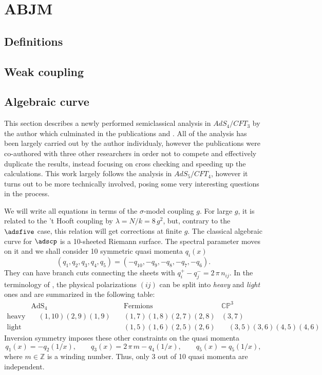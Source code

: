 
\section{ABJM}

\subsection{Definitions}

\subsection{Weak coupling}

\subsection{Algebraic curve}


This section describes a newly performed semiclassical analysis in $AdS_4/CFT_3$ by the author which culminated in the publications \cite{Beccaria:2012qd} and \cite{Beccaria:2012vb}. All of the analysis has been largely carried out by the author individualy, however the publications were co-authored with three other researchers in order not to compete and effectively duplicate the results, instead focusing on cross checking and speeding up the calculations. This work largely follows the analysis in $AdS_5/CFT_4$, however it turns out to be more technically involved, posing some very interesting questions in the process. 

We will write all equations in terms of the $\sigma$-model coupling $g$. For large $g$, it is  related to the 't Hooft coupling by $\lambda = N/k = 8\,g^{2}$, but, contrary to the $\adsfive$ case, this relation will get corrections at finite $g$.  The classical algebraic curve for $\adscp$ is a 10-sheeted Riemann surface. The spectral parameter moves on it and  we shall consider 10 symmetric quasi momenta $q_{i}(x)$ 
\begin{equation}
(q_{1}, q_{2}, q_{3}, q_{4}, q_{5}) = (-q_{10}, -q_{9}, -q_{8}, -q_{7}, -q_{6}).
\end{equation}
They can have branch cuts connecting the sheets with $q_{i}^{+}-q_{j}^{-} = 2\,\pi\,n_{ij}$. In the terminology of \cite{Gromov:2008bz}, the physical polarizations $(ij)$ can be split into {\em heavy} and {\em light} ones and are summarized in the following table:
 $$
 \begin{array}{c|ccc}
  & \mbox{AdS${}_{4}$} & \mbox{Fermions} & \mathbb{CP}^{3} \\
  \hline
  \mbox{heavy} & \quad (1,10) (2,9) (1,9)\quad & (1,7) (1,8) (2,7) (2,8) & (3,7) \\
  \mbox{light} & & (1,5) (1,6) (2,5) (2,6) & \quad (3,5) (3,6) (4,5) (4,6)\quad
  \end{array}
 $$
Inversion symmetry imposes these other constraints on the quasi momenta
\begin{equation}
q_{1}(x) = -q_{2}(1/x), \qquad
q_{3}(x) = 2\,\pi\,m-q_{4}(1/x), \qquad
q_{5}(x) = q_{5}(1/x),
\end{equation}
where $m\in\mathbb Z$ is a winding number. Thus, only 3 out of 10 quasi momenta are independent.

